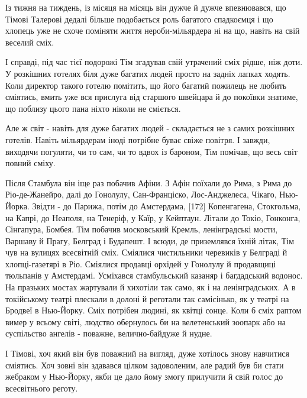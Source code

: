 Із тижня на тиждень, із місяця на місяць він дужче й дужче впевнювався, що Тімові Талерові дедалі більше подобається роль багатого спадкоємця і що хлопець уже не схоче поміняти життя нероби-мільярдера ні на що, навіть на свій веселий сміх.

І справді, під час тієї подорожі Тім згадував свій утрачений сміх рідше, ніж доти. У розкішних готелях біля дуже багатих людей просто на задніх лапках ходять. Коли директор такого готелю помітить, що його багатий пожилець не любить сміятись, вмить уже вся прислуга від старшого швейцара й до покоївки знатиме, що поблизу цього пана ніхто ніколи не сміється.

Але ж світ - навіть для дуже багатих людей - складається не з самих розкішних готелів. Навіть мільярдерам іноді потрібне буває свіже повітря. І завжди, виходячи погуляти, чи то сам, чи то вдвох із бароном, Тім помічав, що весь світ повний сміху.

Після Стамбула він іще раз побачив Афіни. З Афін поїхали до Рима, з Рима до Ріо-де-Жанейро, далі до Гонолулу, Сан-Франціско, Лос-Анджелеса, Чікаго, Нью-Йорка. Звідти - до Парижа, потім до Амстердама, [172] Копенгагена, Стокгольма, на Капрі, до Неаполя, на Тенеріф, у Каїр, у Кейптаун. Літали до Токіо, Гонконга, Сінгапура, Бомбея. Тім побачив московський Кремль, ленінградські мости, Варшаву й Прагу, Белград і Будапешт. І всюди, де приземлявся їхній літак, Тім чув на вулицях всесвітній сміх. Сміялися чистильники черевиків у Белграді й хлопці-газетярі в Ріо. Сміялися продавці орхідей у Гонолулу й продавщиці тюльпанів у Амстердамі. Усміхався стамбульський казаняр і багдадський водонос. На празьких мостах жартували й хихотіли так само, як і на ленінградських. А в токійському театрі плескали в долоні й реготали так самісінько, як у театрі на Бродвеї в Нью-Йорку. Сміх потрібен людині, як квітці сонце. Коли б сміх раптом вимер у всьому світі, людство обернулось би на велетенський зоопарк або на суспільство ангелів - поважне, велично-байдуже й нудне.

І Тімові, хоч який він був поважний на вигляд, дуже хотілось знову навчитися сміятись. Хоч зовні він здавався цілком задоволеним, але радий був би стати жебраком у Нью-Йорку, якби це дало йому змогу прилучити й свій голос до всесвітнього реготу.

